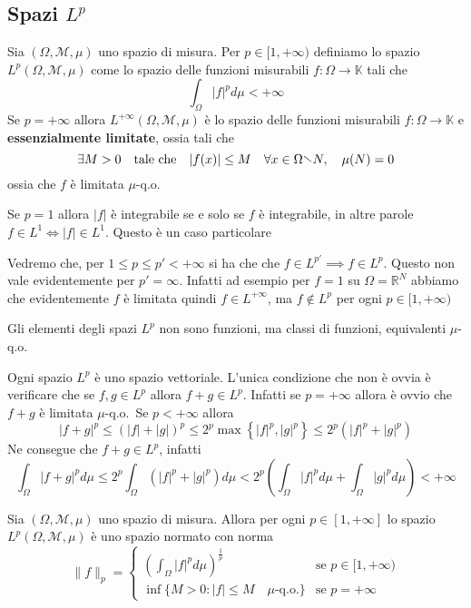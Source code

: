 \newpage
\subsection{Spazi \(L^{p}\) }
\begin{definition}[Spazio \(L^p\)]
    Sia \((\Omega, \mathcal{M}, \mu)\) uno spazio di misura. Per \(p \in [1,
    +\infty)\) definiamo lo spazio \(L^{p}(\Omega, \mathcal{M}, \mu)\) come lo
    spazio delle funzioni misurabili \(f : \Omega \to \mathbb{K}\) tali che
    \[
    \int_{\Omega} |f|^{p} d\mu < +\infty
    \]
    Se \(p = +\infty\) allora \(L^{+\infty}(\Omega, \mathcal{M}, \mu)\) è lo
    spazio delle funzioni misurabili \(f : \Omega \to \mathbb{K}\) e
    \textbf{essenzialmente limitate}, ossia tali che
    \[
        \exists M > 0 \quad \text{tale che} \quad |f(x)| \le M \quad
        \forall x \in \Omega \sminus N, \quad \mu(N) = 0
    \]
    ossia che \(f\) è limitata \(\mu\)-q.o.
\end{definition}
\begin{note}
    Se \(p=1\) allora \(|f|\) è integrabile se e solo se \(f\) è integrabile, in
    altre parole \(f \in L^{1} \iff |f| \in L^{1}\). Questo è un caso
    particolare
\end{note}
\begin{note}
    Vedremo che, per \(1 \le p \le p' < +\infty\) si ha che che \(f \in L^{p'}
    \implies f \in L^{p}\). Questo non vale evidentemente per \(p' = \infty\).
    Infatti ad esempio per \(f = 1\) su \(\Omega = \mathbb{R}^{N}\) abbiamo che
    evidentemente \(f\) è limitata quindi \(f \in L^{+\infty}\), ma \(f \notin
    L^{p}\) per ogni \(p \in [1, +\infty)\) 
\end{note}
Gli elementi degli spazi \(L^{p}\) non sono funzioni, ma classi di funzioni,
equivalenti \(\mu\)-q.o.
\begin{remark}
    Ogni spazio \(L^{p}\) è uno spazio vettoriale. L'unica condizione che non è
    ovvia è verificare che se \(f, g \in L^{p}\) allora \(f+g \in L^{p}\).
    Infatti se \(p = +\infty\) allora è ovvio che \(f+g\) è limitata
    \(\mu\)-q.o.~Se \(p < +\infty\) allora 
    \[
    |f+g|^{p} \le {(|f| + |g|)}^{p} \le 2^{p}
    \max \left\{ |f|^{p}, |g|^{p} \right\} \le 2^{p} (|f|^{p} + |g|^{p})
    \]
    Ne consegue che \(f+g \in L^{p}\), infatti
    \[
        \int_{\Omega} |f+g|^{p} d\mu \le 2^{p} \int_{\Omega} (|f|^{p} + |g|^{p})
        d\mu < 2^{p} {\left( \int_\Omega |f|^{p} d\mu + \int_\Omega |g|^{p} d\mu
        \right)} < +\infty
    \]
\end{remark}
\begin{proposition}\label{prp:spazio-Lp-normato}
    Sia \((\Omega, \mathcal{M}, \mu)\) uno spazio di misura. Allora per ogni
    \(p \in [1, +\infty]\) lo spazio \(L^{p}(\Omega, \mathcal{M}, \mu)\) è uno
    spazio normato con norma
    \[
        \|f\|_p = 
        \begin{cases}
            \displaystyle
            {\left( \int_{\Omega} |f|^{p} d\mu
            \right)}^{\frac{1}{p}} & \text{se } p \in [1, +\infty) \\
            \inf \{M > 0 : |f| \le M \quad \mu\text{-q.o.} \} & \text{se } p = +\infty
        \end{cases}
    \]
\end{proposition}
